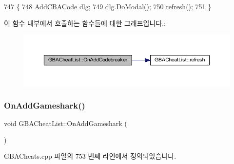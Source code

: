 \begin{DoxyCode}
747 \{
748   \mbox{\hyperlink{class_add_c_b_a_code}{AddCBACode}} dlg;
749   dlg.DoModal();
750   \mbox{\hyperlink{class_g_b_a_cheat_list_a12928bb674926ae02d5a3ceb156a3b53}{refresh}}();
751 \}
\end{DoxyCode}
이 함수 내부에서 호출하는 함수들에 대한 그래프입니다.\+:
\nopagebreak
\begin{figure}[H]
\begin{center}
\leavevmode
\includegraphics[width=350pt]{class_g_b_a_cheat_list_a06eeb598a3bfdccf747014a7d3c996dc_cgraph}
\end{center}
\end{figure}
\mbox{\label{class_g_b_a_cheat_list_acd2892992a12237aa208dbfe53331da2}} 
\subsubsection{\texorpdfstring{On\+Add\+Gameshark()}{OnAddGameshark()}}
{\footnotesize\ttfamily void G\+B\+A\+Cheat\+List\+::\+On\+Add\+Gameshark (\begin{DoxyParamCaption}{ }\end{DoxyParamCaption})\hspace{0.3cm}{\ttfamily [protected]}}



G\+B\+A\+Cheats.\+cpp 파일의 753 번째 라인에서 정의되었습니다.



